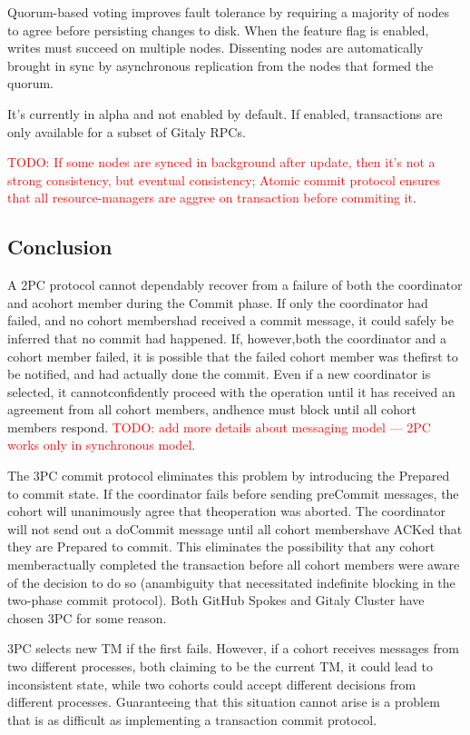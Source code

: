 \documentclass[acmlarge, screen, nonacm]{acmart}
\newcommand{\todo}[1]{\textcolor{red}{TODO: #1}}
\begin{document}
Quorum-based voting improves fault tolerance by requiring a majority of nodes to agree before persisting changes to disk.
When the feature flag is enabled, writes must succeed on multiple nodes.
Dissenting nodes are automatically brought in sync by asynchronous replication from the nodes that formed the quorum.

It's currently in alpha and not enabled by default.
If enabled, transactions are only available for a subset of Gitaly RPCs.

\todo{If some nodes are synced in background after update, then it's not a strong consistency, but eventual consistency;
Atomic commit protocol ensures that all resource-managers are aggree on transaction before commiting it}.

\subsection{Conclusion}

A 2PC protocol cannot dependably recover from a failure of both the coordinator and acohort member during the Commit phase.
If only the coordinator had failed, and no cohort membershad received a commit message, it could safely be inferred
that no commit had happened.
If, however,both the coordinator and a cohort member failed, it is possible that the failed cohort member was thefirst
to be notified, and had actually done the commit.
Even if a new coordinator is selected, it cannotconfidently proceed with the operation until it has received
an agreement from all cohort members, andhence must block until all cohort members respond.
\todo{add more details about messaging model --- 2PC works only in synchronous model}.

The 3PC commit protocol eliminates this problem by introducing the Prepared to commit state.
If the coordinator fails before sending preCommit messages, the cohort will unanimously agree that theoperation was aborted.
The coordinator will not send out a doCommit message until all cohort membershave ACKed that they are Prepared to commit.
This eliminates the possibility that any cohort memberactually completed the transaction before all cohort
members were aware of the decision to do so (anambiguity that necessitated indefinite blocking
in the two-phase commit protocol). Both GitHub Spokes and Gitaly Cluster have chosen 3PC for some reason.

3PC selects new TM if the first fails.
However, if a cohort receives messages from two different processes,
both claiming to be the current TM, it could lead to inconsistent state,
while two cohorts could accept different decisions from different processes.
Guaranteeing that this situation cannot arise is a problem
that is as difficult as implementing a transaction commit protocol.
\end{document}
